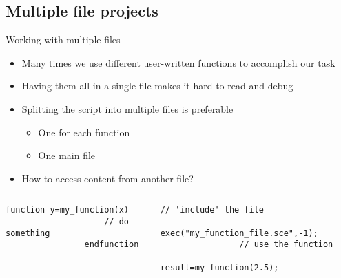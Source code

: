 \documentclass[%
    10pt,
    xcolor={dvipsnames},
    compress, %
]{beamer}
\newcommand{\setitemsep}[1]{\setlength\itemsep{#1}}
\begin{document}
\subsection{Multiple file projects}
\begin{frame}[fragile]{Working with multiple files}
    \begin{itemize}
        \setitemsep{1em}
        \item Many times we use different user-written functions to accomplish our task
        \item Having them all in a single file makes it hard to read and debug
        \item<2-> Splitting the script into multiple files is preferable
        \begin{itemize}
            \item One for each function
            \item One main file
        \end{itemize}
        \item<3-> How to access content from another file?
    \end{itemize}
    \begin{columns}
        \begin{column}{0.5\linewidth}
            \begin{lstlisting}[title={\small \inlinecode{my\_function\_file.sce}}]
                function y=my_function(x)
                    // do something
                endfunction
            \end{lstlisting}
        \end{column}
        \begin{column}{0.5\linewidth}
            \begin{lstlisting}[title={\small \inlinecode{main.sce}}]
                // 'include' the file
                exec("my_function_file.sce",-1);
                // use the function
                result=my_function(2.5);
            \end{lstlisting}
        \end{column}
    \end{columns}
\end{frame}
\end{document}
